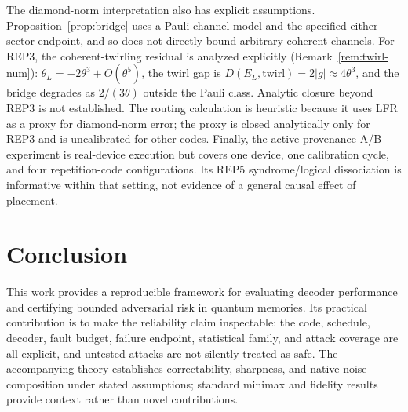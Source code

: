\documentclass[pdflatex,sn-mathphys-num]{sn-jnl}
\theoremstyle{thmstyleone}
\theoremstyle{thmstyletwo}
\theoremstyle{thmstylethree}
\begin{document}
The diamond-norm interpretation also has explicit assumptions. Proposition~\ref{prop:bridge} uses a Pauli-channel model and the specified either-sector endpoint, and so does not directly bound arbitrary coherent channels. For REP3, the coherent-twirling residual is analyzed explicitly (Remark~\ref{rem:twirl-num}): $\theta_L=-2\theta^3+O(\theta^5)$, the twirl gap is $D(E_L,\mathrm{twirl})=2|g|\approx4\theta^3$, and the bridge degrades as $2/(3\theta)$ outside the Pauli class. Analytic closure beyond REP3 is not established. The routing calculation is heuristic because it uses LFR as a proxy for diamond-norm error; the proxy is closed analytically only for REP3 and is uncalibrated for other codes. Finally, the active-provenance A/B experiment is real-device execution but covers one device, one calibration cycle, and four repetition-code configurations. Its REP5 syndrome/logical dissociation is informative within that setting, not evidence of a general causal effect of placement.

\section{Conclusion}

This work provides a reproducible framework for evaluating decoder performance and certifying bounded adversarial risk in quantum memories. Its practical contribution is to make the reliability claim inspectable: the code, schedule, decoder, fault budget, failure endpoint, statistical family, and attack coverage are all explicit, and untested attacks are not silently treated as safe. The accompanying theory establishes correctability, sharpness, and native-noise composition under stated assumptions; standard minimax and fidelity results provide context rather than novel contributions.
\end{document}
